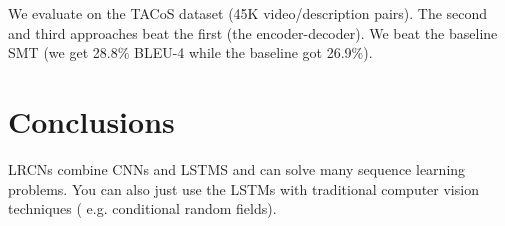 \documentclass[a4paper]{article}
\begin{document}
We evaluate on the TACoS dataset (45K video/description pairs). The second
and third approaches beat the first (the encoder-decoder). We beat the baseline
SMT (we get 28.8\% BLEU-4 while the baseline got 26.9\%).

\section{Conclusions}
LRCNs combine CNNs and LSTMS and can solve many sequence learning problems.
You can also just use the LSTMs with traditional computer vision techniques (
e.g. conditional random fields).
\end{document}
